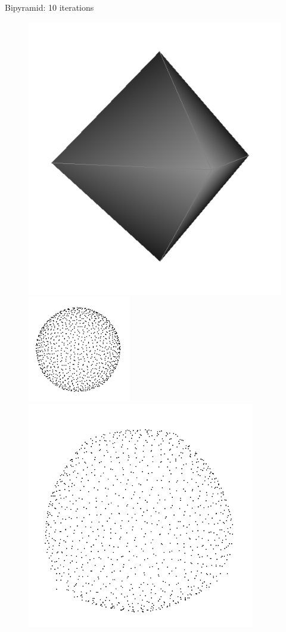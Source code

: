 \documentclass{beamer}
\begin{document}
\begin{frame}
    Bipyramid: 10 iterations
    \begin{figure}
        \centering
        \includegraphics[scale=0.15]{img/bipyramid}
        \includegraphics[scale=0.4]{img/sphere-cube-0}
        \includegraphics[scale=0.2]{img/sphere-bipyramid-10}
    \end{figure}
\end{frame}
\end{document}
